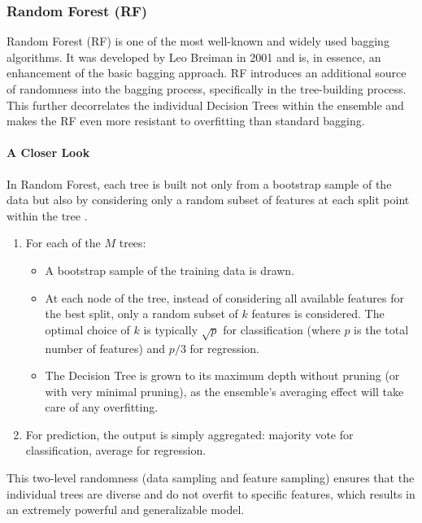 \subsubsection{Random Forest (RF)} 
Random Forest (RF) is one of the most well-known and widely used bagging algorithms. It was developed by Leo Breiman in 2001 and is, in essence, an enhancement of the basic bagging approach. RF introduces an additional source of randomness into the bagging process, specifically in the tree-building process. This further decorrelates the individual Decision Trees within the ensemble and makes the RF even more resistant to overfitting than standard bagging.

\paragraph{A Closer Look} 
In Random Forest, each tree is built not only from a bootstrap sample of the data but also by considering only a random subset of features at each split point within the tree \parencite{almutairi2025intrusion}.
\begin{enumerate}[noitemsep] 
\item For each of the $M$ trees: 
\begin{itemize}[noitemsep] 
\item A bootstrap sample of the training data is drawn.
\item At each node of the tree, instead of considering all available features for the best split, only a random subset of $k$ features is considered. The optimal choice of $k$ is typically $\sqrt{p}$ for classification (where $p$ is the total number of features) and $p/3$ for regression.
\item The Decision Tree is grown to its maximum depth without pruning (or with very minimal pruning), as the ensemble's averaging effect will take care of any overfitting.
\end{itemize} 
\item For prediction, the output is simply aggregated: majority vote for classification, average for regression. 
\end{enumerate} 
This two-level randomness (data sampling and feature sampling) ensures that the individual trees are diverse and do not overfit to specific features, which results in an extremely powerful and generalizable model.

